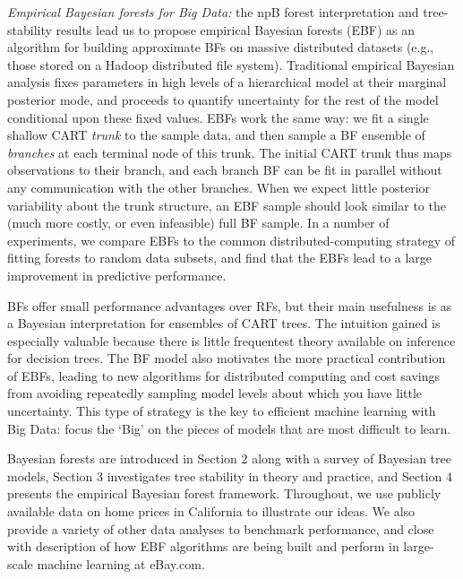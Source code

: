 \documentclass{article}
\begin{document}
\textit{Empirical Bayesian forests for Big Data:} the npB forest
interpretation and tree-stability results lead us to propose empirical
Bayesian forests (EBF) as an algorithm for building approximate BFs on massive
distributed datasets (e.g., those stored on a Hadoop distributed file system).
Traditional empirical Bayesian analysis fixes parameters in high levels of a
hierarchical model at their marginal posterior mode, and proceeds to quantify
uncertainty for the rest of the model conditional upon these fixed values.
EBFs work the same way: we fit a single shallow CART \textit{trunk} to the
sample data, and then sample a BF ensemble of \textit{branches} at each
terminal node of this trunk.  The initial CART trunk thus maps observations to
their branch, and each branch BF can be fit in parallel without any
communication with the other branches.  When we expect little posterior
variability about the trunk structure, an EBF sample should look similar to
the (much more costly, or even infeasible) full BF sample.  In a number of
experiments, we compare EBFs to the common distributed-computing strategy of
fitting forests to random data subsets, and find that the EBFs lead to a large
improvement in predictive performance.



BFs offer small performance advantages over RFs, but their main usefulness is
as a Bayesian interpretation for ensembles of CART trees. The intuition gained
is especially valuable because there is little frequentest theory available on
inference for decision trees.  The BF model also motivates the more practical
contribution of EBFs, leading to new algorithms for distributed computing and
cost savings from avoiding repeatedly sampling model levels about which you
have little uncertainty. This type of strategy is the key to efficient machine
learning with Big Data: focus the `Big' on the pieces of models that are most
difficult to learn.


Bayesian forests are introduced in Section 2 along with a survey
of  Bayesian tree models, Section 3  investigates tree stability in
theory and practice, and Section 4 presents the empirical Bayesian forest
framework. Throughout, we use publicly available data on home prices in
California to illustrate our ideas. We also provide a variety of other data
analyses to benchmark performance, and close with description of how EBF
algorithms are being built and perform in large-scale machine learning at
eBay.com.
\end{document}
